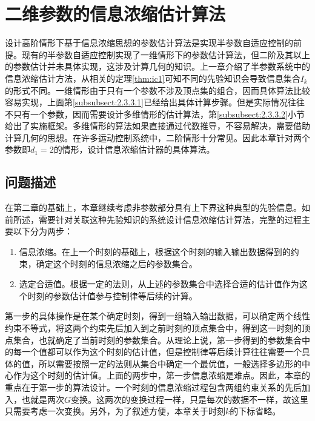 \chapter{二维参数的信息浓缩估计算法}\label{chap:3}
设计高阶情形下基于信息浓缩思想的参数估计算法是实现半参数自适应控制的前提。现有的半参数自适应控制实现了一维情形下的参数估计算法，但二阶及其以上的参数估计并未具体实现，这涉及计算几何的知识。上一章介绍了半参数系统中的信息浓缩估计方法，从相关的定理\ref{thm:ic1}可知不同的先验知识会导致信息集合$I_{k}$的形式不同。一维情形由于只有一个参数不涉及顶点集的组合，因而具体算法比较容易实现，上面第\ref{subsubsect:2.3.3.1}已经给出具体计算步骤。但是实际情况往往不只有一个参数，因而需要设计多维情形的估计算法，第\ref{subsubsect:2.3.3.2}小节给出了实施框架。多维情形的算法如果直接通过代数推导，不容易解决，需要借助计算几何的思想。在许多运动控制系统中，二阶情形十分常见。因此本章针对两个参数即$d_{1}=2$的情形，设计信息浓缩估计器的具体算法。
\section{问题描述}\label{sect:3.1}
在第二章的基础上，本章继续考虑非参数部分具有上下界这种典型的先验信息。如前所述，需要针对关联这种先验知识的系统设计信息浓缩估计算法，完整的过程主要以下分为两步：
\begin{enumerate}
\item 信息浓缩。在上一个时刻的基础上，根据这个时刻的输入输出数据得到的约束，确定这个时刻的信息浓缩之后的参数集合。
\item 选定合适值。根据一定的法则，从上述的参数集合中选择合适的估计值作为这个时刻的参数估计值参与控制律等后续的计算。
\end{enumerate}

第一步的具体操作是在某个确定时刻，得到一组输入输出数据，可以确定两个线性约束不等式，将这两个约束先后加入到之前时刻的顶点集合中，得到这一时刻的顶点集合，也就确定了当前时刻的参数集合。从理论上说，第一步得到的参数集合中的每一个值都可以作为这个时刻的估计值，但是控制律等后续计算往往需要一个具体的值，所以需要按照一定的法则从集合中确定一个最优值，一般选择多边形的中心作为这个时刻的估计值。上面的两步中，第一步信息浓缩是难点。因此，本章的重点在于第一步的算法设计。一个时刻的信息浓缩过程包含两组约束关系的先后加入，也就是两次$G$变换。这两次的变换过程一样，只是每次的数据不一样，故这里只需要考虑一次变换。另外，为了叙述方便，本章关于时刻$k$的下标省略。


